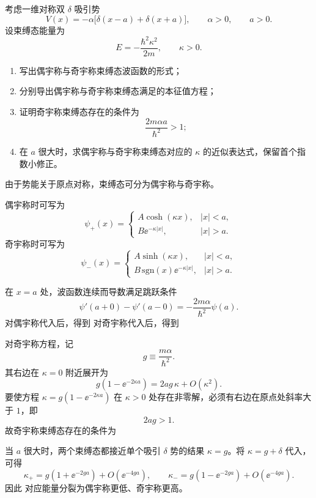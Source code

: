 ﻿

\begin{question}
考虑一维对称双 $\delta$ 吸引势
\[
V(x)=-\alpha\bigl[\delta(x-a)+\delta(x+a)\bigr],
\qquad \alpha>0,
\qquad a>0.
\]
设束缚态能量为
\[
E=-\frac{\hbar^2\kappa^2}{2m},\qquad \kappa>0.
\]

\begin{enumerate}[label=(\arabic*),leftmargin=2.5em]
  \item 写出偶宇称与奇宇称束缚态波函数的形式；
  \item 分别导出偶宇称与奇宇称束缚态满足的本征值方程；
  \item 证明奇宇称束缚态存在的条件为
  \[
  \frac{2m\alpha a}{\hbar^2}>1;
  \]
  \item 在 $a$ 很大时，求偶宇称与奇宇称束缚态对应的 $\kappa$ 的近似表达式，保留首个指数小修正。
\end{enumerate}

\begin{solution}
由于势能关于原点对称，束缚态可分为偶宇称与奇宇称。

偶宇称时可写为
\[
\psi_+(x)=
\begin{cases}
A\cosh(\kappa x),& |x|<a,\\
B \ee^{-\kappa |x|},& |x|>a.
\end{cases}
\]
奇宇称时可写为
\[
\psi_-(x)=
\begin{cases}
A\sinh(\kappa x),& |x|<a,\\
B\,\mathrm{sgn}(x)\ee^{-\kappa |x|},& |x|>a.
\end{cases}
\]

在 $x=a$ 处，波函数连续而导数满足跳跃条件
\[
\psi'(a+0)-\psi'(a-0)=-\frac{2m\alpha}{\hbar^2}\psi(a).
\]
对偶宇称代入后，得到
对奇宇称代入后，得到

对奇宇称方程，记
\[
g\equiv \frac{m\alpha}{\hbar^2}.
\]
其右边在 $\kappa=0$ 附近展开为
\[
g\left(1-\ee^{-2\kappa a}\right)=2ag\,\kappa+O(\kappa^2).
\]
要使方程 $\kappa=g(1-\ee^{-2\kappa a})$ 在 $\kappa>0$ 处存在非零解，必须有右边在原点处斜率大于 $1$，即
\[
2ag>1.
\]
故奇宇称束缚态存在的条件为

当 $a$ 很大时，两个束缚态都接近单个吸引 $\delta$ 势的结果 $\kappa=g$。将 $\kappa=g+\delta$ 代入，可得
\[
\kappa_+=g\left(1+\ee^{-2ga}\right)+O(\ee^{-4ga}),
\qquad
\kappa_-=g\left(1-\ee^{-2ga}\right)+O(\ee^{-4ga}).
\]
因此
对应能量分裂为偶宇称更低、奇宇称更高。
\end{solution}
\end{question}

